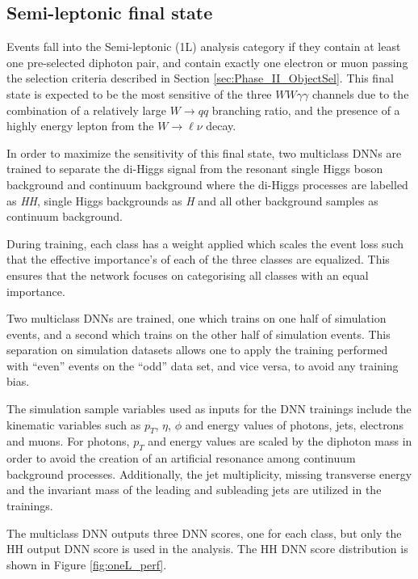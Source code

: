 \subsection{Semi-leptonic final state}
\label{sec:oneL} 

Events fall into the Semi-leptonic (1L) analysis category if they contain at least one pre-selected diphoton pair, and contain exactly one electron or muon passing the selection criteria described in Section \ref{sec:Phase_II_ObjectSel}. This final state is expected to be the most sensitive of the three $WW\gamma\gamma$ channels due to the combination of a relatively large $W\rightarrow qq$ branching ratio, and the presence of a highly energy lepton from the $W\rightarrow \ell\nu$ decay. 

In order to maximize the sensitivity of this final state, two multiclass DNNs are trained to separate the di-Higgs signal from the resonant single Higgs boson background and continuum background where the di-Higgs processes are labelled as \textit{HH}, single Higgs backgrounds as \textit{H} and all other background samples as continuum background.


During training, each class has a weight applied which scales the event loss such that the effective importance's of each of the three classes are equalized. This ensures that the network focuses on categorising all classes with an equal importance. 

Two multiclass DNNs are trained, one which trains on one half of simulation events, and a second which trains on the other half of simulation events. This separation on simulation datasets allows one to apply the training performed with “even” events on the “odd” data set, and vice versa, to avoid any training bias.

The simulation sample variables used as inputs for the DNN trainings include the kinematic variables such as $p_T$, $\eta$, $\phi$ and energy values of photons, jets, electrons and muons. For photons, $p_T$ and energy values are scaled by the diphoton mass in order to avoid the creation of an artificial resonance among continuum background processes. Additionally, the jet multiplicity, missing transverse energy and the invariant mass of the leading and subleading jets are utilized in the trainings. 

The multiclass DNN outputs three DNN scores, one for each class, but only the HH output DNN score is used in the analysis. The HH DNN score distribution is shown in Figure \ref{fig:oneL_perf}. 

